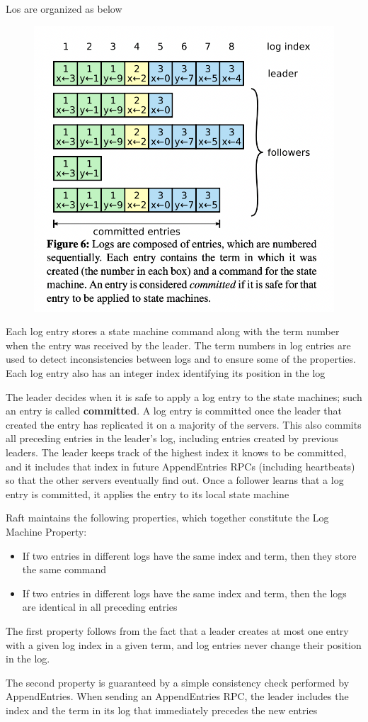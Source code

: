 \documentclass[11pt]{article}
\begin{document}
Los are organized as below
\begin{figure}[htbp]
\centering
\includegraphics[width=.7\textwidth]{../images/6.824/6.png}
\label{}
\end{figure}
Each log entry stores a state machine command along with the term number when the entry was
received by the leader. The term numbers in log entries are used to detect inconsistencies
between logs and to ensure some of the properties. Each log entry also has an integer index
identifying its position in the log

The leader decides when it is safe to apply a log entry to the state machines; such an entry is
called \textbf{committed}. A log entry is committed once the leader that created the entry has replicated
it on a majority of the servers. This also commits all preceding entries in the leader's log,
including entries created by previous leaders. The leader keeps track of the highest index it
knows to be committed, and it includes that index in future AppendEntries RPCs (including
heartbeats) so that the other servers eventually find out. Once a follower learns that a log
entry is committed, it applies the entry to its local state machine

Raft maintains the following properties, which together constitute the Log Machine Property:
\begin{itemize}
\item If two entries in different logs have the same index and term, then they store the same command
\item If two entries in different logs have the same index and term, then the logs are identical in
all preceding entries
\end{itemize}

The first property follows from the fact that a leader creates at most one entry with a given
log index in a given term, and log entries never change their position in the log.

The second property is guaranteed by a simple consistency check performed by AppendEntries. When
sending an AppendEntries RPC, the leader includes the index and the term in its log that
immediately precedes the new entries
\end{document}
